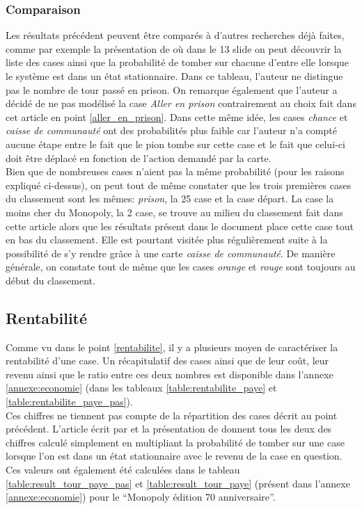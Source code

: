 \documentclass[letterpaper]{article}
\newcommand{\monopolyEditionAnni}{``Monopoly édition 70\up{ème} anniversaire''}
\begin{document}
    \subsubsection{Comparaison}
      Les résultats précédent peuvent être comparés à d'autres recherches déjà faites,
      comme par exemple la présentation de \cite{PP_MONOPOLY} où dans le 13 slide
      on peut découvrir la liste des cases ainsi que la probabilité de tomber sur 
      chacune d'entre elle lorsque le système est dans un état stationnaire.  Dans ce tableau, l'auteur
      ne distingue pas le nombre de tour passé en prison.  On remarque également
      que l'auteur a décidé de ne pas modélisé la case \textit{Aller en prison}
      contrairement au choix fait dans cet article en point \ref{aller_en_prison}.
      Dans cette même idée, les cases \textit{chance} et \textit{caisse de communauté}
      ont des probabilités plus faible car l'auteur n'a compté aucune étape entre
      le fait que le pion tombe sur cette case et le fait que celui-ci doit être
      déplacé en fonction de l'action demandé par la carte.\\
      Bien que de nombreuses cases n'aient pas la même probabilité (pour les raisons
      expliqué ci-dessus), on peut tout de même constater que les trois premières cases
      du classement sont les mêmes: \textit{prison}, la 25 case et la case départ.
      La case la moins cher du Monopoly, la 2 case, se trouve au milieu du classement
      fait dans cette article alors que les résultats présent dans le document 
      place cette case tout en bas du classement.  Elle est pourtant visitée plus régulièrement
      suite à la possibilité de s'y rendre grâce à une carte \textit{caisse de communauté}.
      De manière générale, on constate tout de même que les cases \textit{orange} et 
      \textit{rouge} sont toujours au début du classement.
      
  \subsection{Rentabilité}
    Comme vu dans le point \ref{rentabilite}, il y a plusieurs moyen
    de caractériser la rentabilité d'une case.  Un récapitulatif des cases
    ainsi que de leur coût, leur revenu ainsi que le ratio entre ces deux nombres
    est disponible dans l'annexe \ref{annexe:economie} (dans les tableaux 
    \ref{table:rentabilite_paye} et \ref{table:rentabilite_paye_pas}).\\
    Ces chiffres ne tiennent pas compte de la répartition des cases décrit au 
    point précédent.  L'article écrit par \cite{MONOPOLY_ARTICLE} et la 
    présentation de \cite{PP_MONOPOLY} donnent tous les deux des chiffres
    calculé simplement en multipliant la probabilité de tomber sur une 
    case lorsque l'on est dans un état stationnaire avec le revenu de la case
    en question.  Ces valeurs ont également été calculées dans le tableau
    \ref{table:result_tour_paye_pas} et \ref{table:result_tour_paye} 
    (présent dans l'annexe \ref{annexe:economie}) pour le \monopolyEditionAnni.
    
\end{document}
